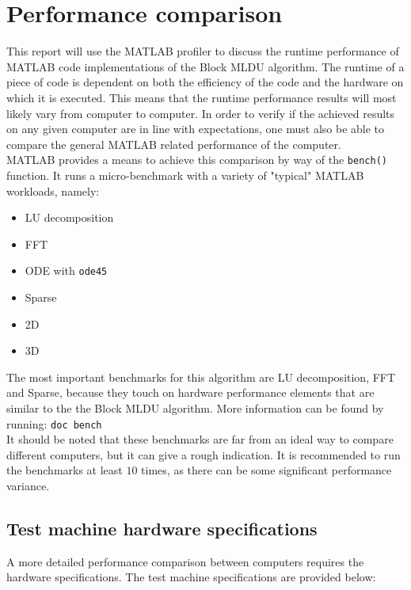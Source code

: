 \chapter{Performance comparison}

This report will use the MATLAB profiler to discuss the runtime performance of MATLAB code implementations of the Block MLDU algorithm. The runtime of a piece of code is dependent on both the efficiency of the code and the hardware on which it is executed. This means that the runtime performance results will most likely vary from computer to computer. In order to verify if the achieved results on any given computer are in line with expectations, one must also be able to compare the general MATLAB related performance of the computer.\\

\noindent MATLAB provides a means to achieve this comparison by way of the \texttt{bench()} function. It runs a micro-benchmark with a variety of "typical" MATLAB workloads, namely:

\begin{itemize}
    \item LU decomposition
    \item FFT
    \item ODE with \texttt{ode45}
    \item Sparse
    \item 2D
    \item 3D
\end{itemize}

\noindent The most important benchmarks for this algorithm are LU decomposition, FFT and Sparse, because they touch on hardware performance elements that are similar to the the Block MLDU algorithm. More information can be found by running: \texttt{doc bench}\\

\noindent It should be noted that these benchmarks are far from an ideal way to compare different computers, but it can give a rough indication. It is recommended to run the benchmarks at least $10$ times, as there can be some significant performance variance.

\section{Test machine hardware specifications}

A more detailed performance comparison between computers requires the hardware specifications. The test machine specifications are provided below:

